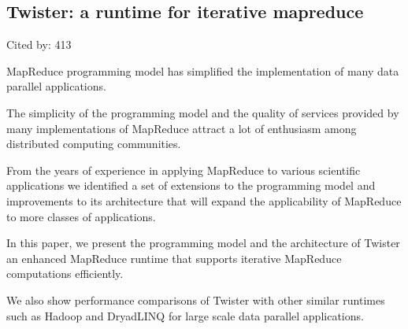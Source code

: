 \documentclass[a4paper,11pt]{article}
\begin{document}
\subsection*{Twister: a runtime for iterative mapreduce}
{\color{cyan} {\color{magenta} Cited by: 413}

MapReduce programming model has simplified the implementation of many data parallel applications. 

The simplicity of the programming model and 
the quality of services provided by many implementations of MapReduce 
attract a lot of enthusiasm among distributed computing communities. 

From the years of experience in applying MapReduce to various scientific applications 
we identified a set of 
extensions to the programming model and 
improvements to its architecture that will 
expand the applicability of MapReduce to more classes of applications. 

In this paper, 
we present 
the programming model and the architecture of 
{\color{black} Twister\cite{twister}} 
an enhanced MapReduce runtime that 
supports iterative MapReduce computations efficiently. 

We also show 
performance comparisons of Twister with other similar runtimes 
such as Hadoop and DryadLINQ 
for large scale data parallel applications.

}
\end{document}
